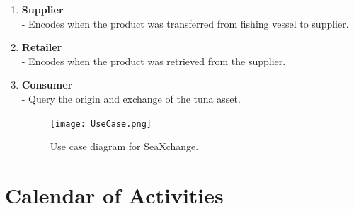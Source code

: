 \begin{itemize}
\begin{enumerate}
			\item \textbf{Supplier}
			\\- Encodes when the product was transferred from fishing vessel to supplier.
			
			\item \textbf{Retailer}
			\\- Encodes when the product was retrieved from the supplier.
			
			\item \textbf{Consumer}
			\\- Query the origin and exchange of the tuna asset.
		
			\begin{figure}[h]  
				\centering
				\texttt{[image: UseCase.png]}
				\caption{Use case diagram for SeaXchange.}
				\label{fig:usecase}  
			\end{figure}
			
		\end{enumerate}
	\end{itemize}

\clearpage
\newpage
\section{Calendar of Activities}
%
%
\newcommand{\weekone}{\textbullet}
\newcommand{\weektwo}{\textbullet \textbullet}
\newcommand{\weekthree}{\textbullet \textbullet \textbullet}
\newcommand{\weekfour}{\textbullet \textbullet \textbullet \textbullet}

%
%

